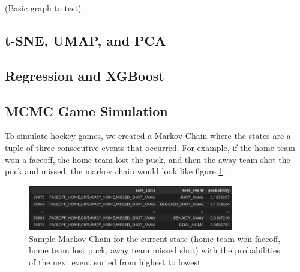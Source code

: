 \documentclass[11pt]{article}
\begin{document}
(Basic graph to test)

\begin{center}
\end{center}

\subsection{t-SNE, UMAP, and PCA}

\subsection{Regression and XGBoost}

\subsection{MCMC Game Simulation}

To simulate hockey games, we created a Markov Chain where the states are a tuple of three consecutive
events that occurred. For example, if the home team won a faceoff, the home team lost the puck, and 
then the away team shot the puck and missed, the markov chain would look like figure \ref{fig:markov_chain_sample}.

\begin{figure}[H]
    \centering
    \includegraphics[width=0.8\textwidth]{images/markov_chain_sample.png}
    \caption{Sample Markov Chain for the current state (home team won faceoff, 
    home team lost puck, away team missed shot) with the probabilities of the next event 
    sorted from highest to lowest}
    \label{fig:markov_chain_sample}
\end{figure}
\end{document}
